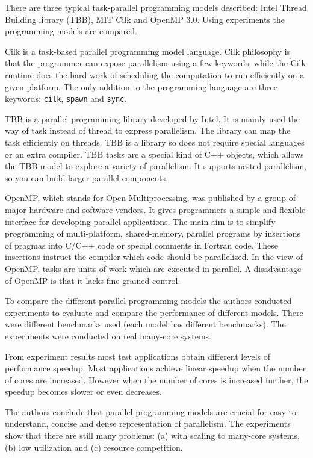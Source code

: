 There are three typical task-parallel programming models described: Intel
Thread Building library (TBB), MIT Cilk and OpenMP 3.0. Using experiments the
programming models are compared.

Cilk is a task-based parallel programming model language. Cilk philosophy is
that the programmer can expose parallelism using a few keywords, while the Cilk
runtime does the hard work of scheduling the computation to run efficiently on
a given platform. The only addition to the programming language are three
keywords: \texttt{cilk}, \texttt{spawn} and \texttt{sync}.

TBB is a parallel programming library developed by Intel. It is mainly used the
way of task instead of thread to express parallelism. The library can map the
task efficiently on threads. TBB is a library so does not require special
languages or an extra compiler. TBB tasks are a special kind of C++ objects,
which allows the TBB model to explore a variety of parallelism. It supports
nested parallelism, so you can build larger parallel components.

OpenMP, which stands for Open Multiprocessing, was published by a group of
major hardware and software vendors. It gives programmers a simple and flexible
interface for developing parallel applications. The main aim is to simplify
programming of multi-platform, shared-memory, parallel programs by insertions
of pragmas into C/C++ code or special comments in Fortran code. These
insertions instruct the compiler which code should be parallelized. In the view
of OpenMP, tasks are units of work which are executed in parallel. A
disadvantage of OpenMP is that it lacks fine grained control.

To compare the different parallel programming models the authors conducted
experiments to evaluate and compare the performance of different models. There
were different benchmarks used (each model has different benchmarks). The
experiments were conducted on real many-core systems.

From experiment results most test applications obtain different levels of
performance speedup. Most applications achieve linear speedup when the number
of cores are increased. However when the number of cores is increased further,
the speedup becomes slower or even decreases.

The authors conclude that parallel programming models are crucial for
easy-to-understand, concise and dense representation of parallelism. The
experiments show that there are still many problems: (a) with scaling to
many-core systems, (b) low utilization and (c) resource competition.

